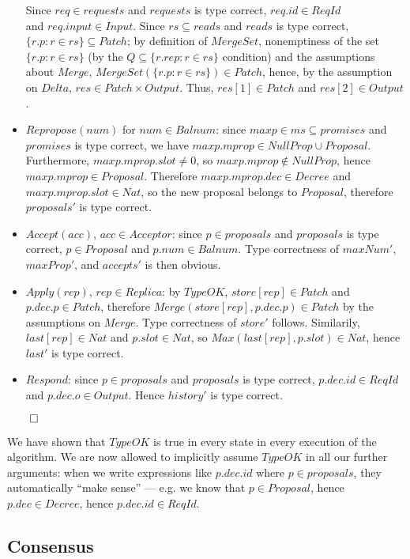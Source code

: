 \documentclass[12pt,a4paper,en]{pracamgr}
\begin{document}
\begin{itemize}
        Since $req \in requests$ and $requests$ is type correct, $req.id \in ReqId$\\
        and $req.input \in Input$. Since $rs \subseteq reads$ and $reads$ is type correct, $\{r.p: r \in rs\} \subseteq Patch$; by definition of $MergeSet$, nonemptiness of the set $\{r.p: r \in rs\}$ (by the $Q \subseteq \{r.rep: r \in rs\}$ condition) and the assumptions about $Merge$, $MergeSet(\{r.p: r \in rs\}) \in Patch$, hence, by the assumption on $Delta$, $res \in Patch \times Output$. Thus, $res[1] \in Patch$ and $res[2] \in Output$.
    \item $Repropose(num)$ for $num \in Balnum$: since $maxp \in ms \subseteq promises$ and $promises$ is type correct, we have $maxp.mprop \in NullProp \cup Proposal$. Furthermore, $maxp.mprop.slot \neq 0$, so $maxp.mprop \notin NullProp$, hence $maxp.mprop \in Proposal$. Therefore $maxp.mprop.dec \in Decree$ and $maxp.mprop.slot \in Nat$, so the new proposal belongs to $Proposal$, therefore $proposals'$ is type correct.
    \item $Accept(acc)$, $acc \in Acceptor$: since $p \in proposals$ and $proposals$ is type correct, $p \in Proposal$ and $p.num \in Balnum$. Type correctness of $maxNum'$, $maxProp'$, and $accepts'$ is then obvious.
    \item $Apply(rep)$, $rep \in Replica$: by $TypeOK$, $store[rep] \in Patch$ and $p.dec.p \in Patch$, therefore $Merge(store[rep], p.dec.p) \in Patch$ by the assumptions on $Merge$. Type correctness of $store'$ follows. Similarily, $last[rep] \in Nat$ and $p.slot \in Nat$, so $Max(last[rep], p.slot) \in Nat$, hence $last'$ is type correct.
    \item $Respond$: since $p \in proposals$ and $proposals$ is type correct, $p.dec.id \in ReqId$ and $p.dec.o \in Output$. Hence $history'$ is type correct.
\end{itemize}
\begin{flushright}$\qed$\end{flushright}

We have shown that $TypeOK$ is true in every state in every execution of the algorithm. We are now allowed to implicitly assume $TypeOK$ in all our further arguments: when we write expressions like $p.dec.id$ where $p \in proposals$, they automatically ``make sense'' --- e.g. we know that $p \in Proposal$, hence $p.dec \in Decree$, hence $p.dec.id \in ReqId$.

\subsection{Consensus}
\end{document}
